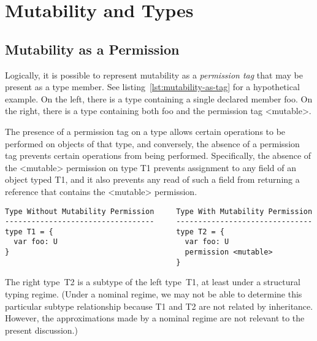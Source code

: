 \section{Mutability and Types}


\subsection{Mutability as a Permission}

Logically, it is possible to represent mutability as a {\em permission tag} that may be present as a type member. See listing~\ref{lst:mutability-as-tag} for a hypothetical example. On the left, there is a type containing a single declared member {\cd foo}. On the right, there is a type containing both {\cd foo} and the permission tag {\cd <mutable>}.

The presence of a permission tag on a type allows certain operations to be performed on objects of that type, and conversely, the absence of a permission tag prevents certain operations from being performed. Specifically, the absence of the {\cd <mutable>} permission on type {\cd T1} prevents assignment to any field of an object typed {\cd T1}, and it also prevents any read of such a field from returning a reference that contains the {\cd <mutable>} permission.

\begin{lstlisting}[float=htbp, caption={Mutability as a Permission Tag}, label={lst:mutability-as-tag}]
Type Without Mutability Permission     Type With Mutability Permission
----------------------------------     -------------------------------
type T1 = {                            type T2 = {
  var foo: U                             var foo: U
}                                        permission <mutable>
                                       }
\end{lstlisting}

The right type~{\cd T2} is a subtype of the left type~{\cd T1}, at least under a structural typing regime. (Under a nominal regime, we may not be able to determine this particular subtype relationship because {\cd T1} and {\cd T2} are not related by inheritance. However, the approximations made by a nominal regime are not relevant to the present discussion.)


